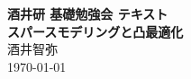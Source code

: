 \documentclass[a4paper,12pt]{jbook}
\begin{document}

\pagestyle{empty}

\vspace*{6cm}
\begin{center}
{%
\Large\bf 酒井研 基礎勉強会 テキスト}\\
{\bf スパースモデリングと凸最適化}\\
\vspace{2\baselineskip}
酒井智弥\\
\today
\end{center}

\pagestyle{empty}
\tableofcontents

\pagestyle{fancy}









\end{document}
